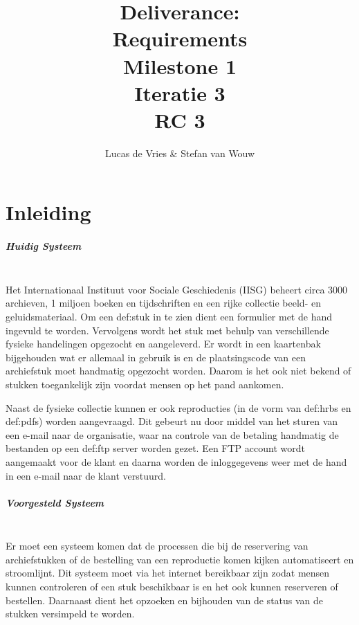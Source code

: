 \documentclass[a4paper,titlepage]{report}
\title{Deliverance:\\ Requirements\\ Milestone 1\\ Iteratie 3\\ RC 3}
\author{Lucas de Vries \& Stefan van Wouw}
\begin{document}
\maketitle


\setcounter{secnumdepth}{5}
\setcounter{tocdepth}{2}

\tableofcontents
\pagebreak


\chapter{Inleiding}
\paragraph*{Huidig Systeem}\hfill\\
Het Internationaal Instituut voor Sociale Geschiedenis (IISG) beheert circa 3000
archieven, 1 miljoen boeken en tijdschriften en een rijke collectie beeld- en
geluidsmateriaal. Om een \gls{def:stuk} 
in te zien dient een formulier met de hand
ingevuld te worden. Vervolgens wordt het stuk met behulp van verschillende
fysieke handelingen opgezocht en aangeleverd. Er wordt in een kaartenbak
bijgehouden wat er allemaal in gebruik is en de plaatsingscode van een
archiefstuk moet handmatig opgezocht worden. Daarom is het ook niet bekend of
stukken toegankelijk zijn voordat mensen op het pand aankomen.

Naast de fysieke collectie kunnen er ook reproducties (in de vorm van
\glspl{def:hrb} en \glspl{def:pdf}) worden aangevraagd. Dit gebeurt nu door middel van het
sturen van een e-mail naar de organisatie, waar na controle van de betaling
handmatig de bestanden op een \gls{def:ftp} server worden gezet. Een FTP account wordt
aangemaakt voor de klant en daarna worden de inloggegevens weer met de hand in
een e-mail naar de klant verstuurd.

\paragraph*{Voorgesteld Systeem}\hfill\\
Er moet een systeem komen dat de processen die bij de reservering van
archiefstukken of de bestelling van een reproductie komen kijken automatiseert
en stroomlijnt. Dit systeem moet via het internet bereikbaar zijn zodat mensen
kunnen controleren of een stuk beschikbaar is en het ook kunnen reserveren of
bestellen. Daarnaast dient het opzoeken en bijhouden van de status van de
stukken versimpeld te worden.
\end{document}
